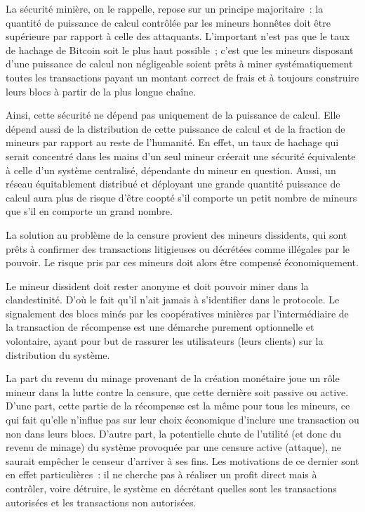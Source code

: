La sécurité minière, on le rappelle, repose sur un principe majoritaire~: la quantité de puissance de calcul contrôlée par les mineurs honnêtes doit être supérieure par rapport à celle des attaquants. L'important n'est pas que le taux de hachage de Bitcoin soit le plus haut possible~; c'est que les mineurs disposant d'une puissance de calcul non négligeable soient prêts à miner systématiquement toutes les transactions payant un montant correct de frais et à toujours construire leurs blocs à partir de la plus longue chaîne. %

Ainsi, cette sécurité ne dépend pas uniquement de la puissance de calcul. Elle dépend aussi de la distribution de cette puissance de calcul et de la fraction de mineurs par rapport au reste de l'humanité. En effet, un taux de hachage qui serait concentré dans les mains d'un seul mineur créerait une sécurité équivalente à celle d'un système centralisé, dépendante du mineur en question. Aussi, un réseau équitablement distribué et déployant une grande quantité puissance de calcul aura plus de risque d'être coopté s'il comporte un petit nombre de mineurs que s'il en comporte un grand nombre.

La solution au problème de la censure provient des mineurs dissidents, qui sont prêts à confirmer des transactions litigieuses ou décrétées comme illégales par le pouvoir. Le risque pris par ces mineurs doit alors être compensé économiquement.

Le mineur dissident doit rester anonyme et doit pouvoir miner dans la clandestinité. D'où le fait qu'il n'ait jamais à s'identifier dans le protocole. Le signalement des blocs minés par les coopératives minières par l'intermédiaire de la transaction de récompense est une démarche purement optionnelle et volontaire, ayant pour but de rassurer les utilisateurs (leurs clients) sur la distribution du système.

La part du revenu du minage provenant de la création monétaire joue un rôle mineur dans la lutte contre la censure, que cette dernière soit passive ou active. D'une part, cette partie de la récompense est la même pour tous les mineurs, ce qui fait qu'elle n'influe pas sur leur choix économique d'inclure une transaction ou non dans leurs blocs. D'autre part, la potentielle chute de l'utilité (et donc du revenu de minage) du système provoquée par une censure active (attaque), ne saurait empêcher le censeur d'arriver à ses fins. Les motivations de ce dernier sont en effet particulières~: il ne cherche pas à réaliser un profit direct mais à contrôler, voire détruire, le système en décrétant quelles sont les transactions autorisées et les transactions non autorisées.

